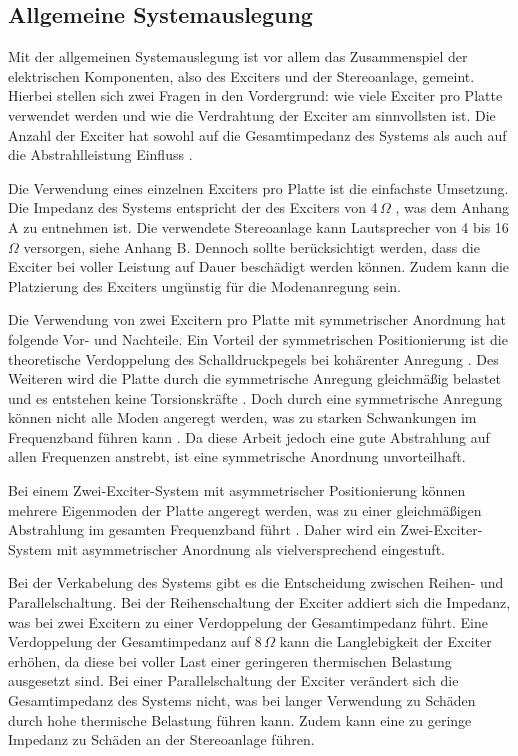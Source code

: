 \clearpage

\subsection{Allgemeine Systemauslegung}

Mit der allgemeinen Systemauslegung ist vor allem das Zusammenspiel der elektrischen Komponenten, also des Exciters und der Stereoanlage, gemeint. Hierbei stellen sich zwei Fragen in den Vordergrund: wie viele Exciter pro Platte verwendet werden und wie die Verdrahtung der Exciter am sinnvollsten ist.
Die Anzahl der Exciter hat sowohl auf die Gesamtimpedanz des Systems als auch auf die Abstrahlleistung Einfluss \cite{Bai2001}.

Die Verwendung eines einzelnen Exciters pro Platte ist die einfachste Umsetzung. Die Impedanz des Systems entspricht der des Exciters von 4\,$\Omega$ \cite{DaytonAudio2024}, was dem Anhang A zu entnehmen ist. Die verwendete Stereoanlage kann Lautsprecher von 4 bis 16\,$\Omega$ versorgen, siehe Anhang B. Dennoch sollte berücksichtigt werden, dass die Exciter bei voller Leistung auf Dauer beschädigt werden können. Zudem kann die Platzierung des Exciters ungünstig für die Modenanregung sein. 

Die Verwendung von zwei Excitern pro Platte mit symmetrischer Anordnung hat folgende Vor- und Nachteile. Ein Vorteil der symmetrischen Positionierung ist die theoretische Verdoppelung des Schalldruckpegels bei kohärenter Anregung \cite{Moeser2005}. Des Weiteren wird die Platte durch die symmetrische Anregung gleichmäßig belastet und es entstehen keine Torsionskräfte \cite{Moeser2005}. Doch durch eine symmetrische Anregung können nicht alle Moden angeregt werden, was zu starken Schwankungen im Frequenzband führen kann \cite{Pueo2009}. Da diese Arbeit jedoch eine gute Abstrahlung auf allen Frequenzen anstrebt, ist eine symmetrische Anordnung unvorteilhaft. 

Bei einem Zwei-Exciter-System mit asymmetrischer Positionierung können mehrere Eigenmoden der Platte angeregt werden, was zu einer gleichmäßigen Abstrahlung im gesamten Frequenzband führt \cite{Zenker2019}. Daher wird ein Zwei-Exciter-System mit asymmetrischer Anordnung als vielversprechend eingestuft.  

Bei der Verkabelung des Systems gibt es die Entscheidung zwischen Reihen- und Parallelschaltung. Bei der Reihenschaltung der Exciter addiert sich die Impedanz, was bei zwei Excitern zu einer Verdoppelung der Gesamtimpedanz führt. Eine Verdoppelung der Gesamtimpedanz auf 8\,$\Omega$ kann die Langlebigkeit der Exciter erhöhen, da diese bei voller Last einer geringeren thermischen Belastung ausgesetzt sind.
Bei einer Parallelschaltung der Exciter verändert sich die Gesamtimpedanz des Systems nicht, was bei langer Verwendung zu Schäden durch hohe thermische Belastung führen kann. Zudem kann eine zu geringe Impedanz zu Schäden an der Stereoanlage führen.


